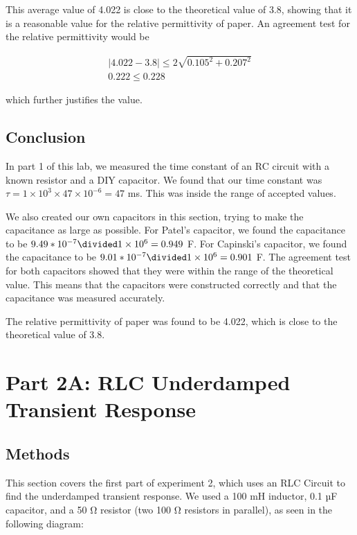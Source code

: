\documentclass[11pt]{article}
\let\oldsection\section
\renewcommand\section{\clearpage\oldsection}
\begin{document}
    This average value of 4.022 is close to the theoretical value of 3.8, showing that it is a reasonable value for the relative permittivity of paper.
    An agreement test for the relative permittivity would be
    \begin{e}
        \begin{align*}
            |4.022 - 3.8| \le 2 \sqrt{0.105^2 + 0.207^2} \\
            0.222 \le 0.228
        \end{align*}
    \end{e}
    which further justifies the value.


    \subsection{Conclusion}\label{subsec:part1_conclusion}

    In part 1 of this lab, we measured the time constant of an RC circuit with a known resistor and a DIY capacitor.
    We found that our time constant was $\tau = 1 \times 10^{3} \times 47 \times 10^{-6} = 47$ ms.
    This was inside the range of accepted values.

    We also created our own capacitors in this section, trying to make the capacitance as large as possible.
    For Patel's capacitor, we found the capacitance to be $9.49*10^{-7} \divided 1 \times 10^{6} = 0.949$ F\@.
    For Capinski's capacitor, we found the capacitance to be $9.01*10^{-7} \divided 1 \times 10^{6} = 0.901$ F\@.
    The agreement test for both capacitors showed that they were within the range of the theoretical value.
    This means that the capacitors were constructed correctly and that the capacitance was measured accurately.

    The relative permittivity of paper was found to be 4.022, which is close to the theoretical value of 3.8.



    \section{Part 2A: RLC Underdamped Transient Response}\label{sec:part2a_underdamped}
    \subsection{Methods}\label{subsec:part2a_methods}
    This section covers the first part of experiment 2, which uses an RLC Circuit to find the underdamped transient response. We used a 100 mH inductor, 0.1 µF capacitor, and a 50 Ω resistor (two 100 Ω resistors in parallel), as seen in the following diagram:
\end{document}
